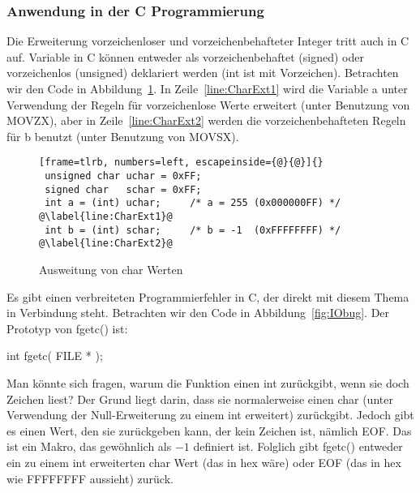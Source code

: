 \subsubsection{Anwendung in der C Programmierung}

Die Erweiterung  vorzeichenloser und
vorzeichenbehafteter Integer tritt auch in C auf. Variable in C
k\"{o}nnen entweder als vorzeichenbehaftet (signed) oder vorzeichenlos
(unsigned) deklariert werden ({\code int} ist mit Vorzeichen).
Betrachten wir den Code in Abbildung~\ref{fig:charExt}. In
Zeile~\ref{line:CharExt1} wird die Variable {\code a} unter
Verwendung der Regeln f\"{u}r vorzeichenlose Werte erweitert (unter
Benutzung von {\code MOVZX}), aber in Zeile~\ref{line:CharExt2}
werden die vorzeichenbehafteten Regeln f\"{u}r {\code b} benutzt (unter
Benutzung von {\code MOVSX}).

\begin{figure}[ht]
\begin{lstlisting}[frame=tlrb, numbers=left, escapeinside={@}{@}]{}
 unsigned char uchar = 0xFF;
 signed char   schar = 0xFF;
 int a = (int) uchar;     /* a = 255 (0x000000FF) */    @\label{line:CharExt1}@
 int b = (int) schar;     /* b = -1  (0xFFFFFFFF) */    @\label{line:CharExt2}@
\end{lstlisting}
\caption{Ausweitung von {\code char} Werten} \label{fig:charExt}
\end{figure}

Es gibt einen verbreiteten Programmierfehler in C, der direkt mit
diesem Thema in Verbindung steht. Betrachten wir den Code in
Abbildung~\ref{fig:IObug}. Der Prototyp von {\code fgetc()} ist:
\begin{CodeQuote}
 int fgetc( FILE * );
\end{CodeQuote}
Man k\"{o}nnte sich fragen, warum die Funktion einen {\code int}
zur\"{u}ckgibt, wenn sie doch Zeichen liest? Der Grund liegt darin, dass
sie normalerweise einen {\code char} (unter Verwendung der
Null-Erweiterung zu einem {\code int} erweitert) zur\"{u}ckgibt. Jedoch
gibt es einen Wert, den sie zur\"{u}ckgeben kann, der kein Zeichen ist,
n\"{a}mlich {\code EOF}\@. Das ist ein Makro, das gew\"{o}hnlich als $-1$
definiert ist. Folglich gibt {\code fgetc()} entweder ein zu einem
{\code int} erweiterten {\code char} Wert (das in hex {} w\"{a}re) oder {\code EOF} (das in hex wie {\code
FFFFFFFF} aussieht) zur\"{u}ck.

